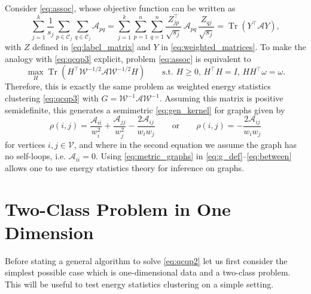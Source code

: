 \documentclass[aps,preprint,nofootinbib,floatfix]{revtex4-1}
\DeclareMathOperator{\Tr}{Tr}
\newcommand\C{{\mathcal{C}}}
\newcommand\om{\omega}
\begin{document}
Consider \eqref{eq:assoc}, whose objective function can be written as
\begin{equation}
\sum_{j=1}^k \dfrac{1}{s_j} \sum_{p \in \C_j} \sum_{q \in \C_j}
\mathcal{A}_{pq} = \sum_{j=1}^k \sum_{p=1}^n \sum_{q=1}^n 
\dfrac{Z^\top_{jp}}{\sqrt{s_j}} \, \mathcal{A}_{pq} \, 
\dfrac{Z_{qj}}{\sqrt{s_j}}
= \Tr\left( Y^\top \mathcal{A} Y \right) ,
\end{equation}
with $Z$ defined in \eqref{eq:label_matrix} and $Y$ in
\eqref{eq:weighted_matrices}. To make the analogy with \eqref{eq:qcqp3}
explicit,  problem \eqref{eq:assoc} is equivalent to
\begin{equation}
\max_H \Tr\left( H^\top \mathcal{W}^{-1/2} \mathcal{A} \mathcal{W}^{-1/2} H 
\right) \qquad \mbox{s.t. $H\ge 0$, $H^\top H = I$, $H H^\top
\om=\om$}.
\end{equation}
Therefore, this is exactly the same problem as weighted energy statistics
clustering \eqref{eq:qcqp3} with 
$G = \mathcal{W}^{-1} \mathcal{A} \mathcal{W}^{-1}$. Assuming this
matrix is positive semidefinite, this generates a semimetric
\eqref{eq:gen_kernel} for graphs given by
\begin{equation}
\label{eq:metric_graphs}
\rho(i,j) = 
\dfrac{\mathcal{A}_{ii}}{w_i^{2}}
+\dfrac{\mathcal{A}_{jj}}{w_j^{2}}
-\dfrac{2 \mathcal{A}_{ij}}{w_i w_j} \qquad\mbox{or}\qquad
\rho(i,j) = -\dfrac{2 \mathcal{A}_{ij}}{w_i w_j}
\end{equation}
for vertices $i,j \in \mathcal{V}$, and 
where in the second equation we assume the graph has no self-loops,
i.e. $\mathcal{A}_{ii} = 0$. Using \eqref{eq:metric_graphs} 
in \eqref{eq:g_def}--\eqref{eq:between}
allows one to use energy statistics theory for inference
on graphs.


\section{Two-Class Problem in One Dimension}
\label{sec:twoclass}

Before stating a general algorithm to solve \eqref{eq:qcqp2} 
let us first consider the simplest possible case which
is one-dimensional data and a two-class problem. This will be useful to test
energy statistics clustering on a simple setting.
\end{document}
